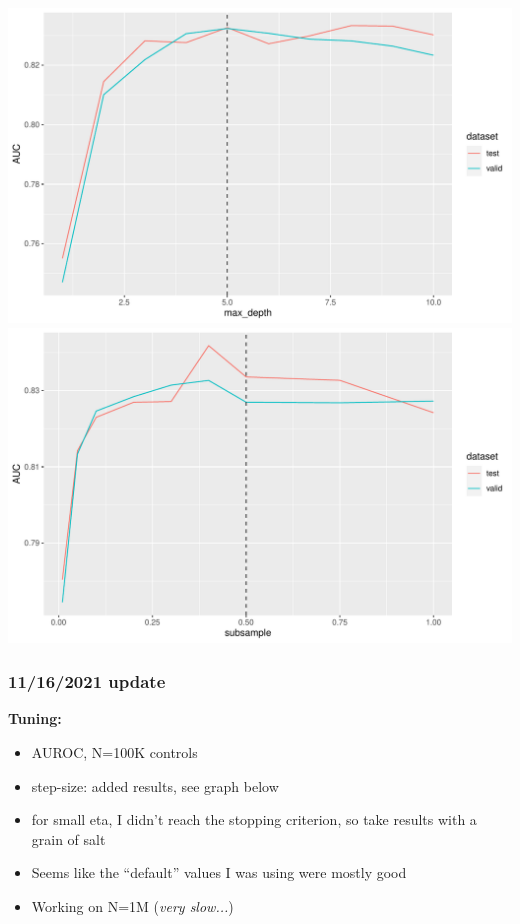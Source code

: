 \documentclass[12pt]{article}
\begin{document}
\begin{center}
\includegraphics[width=.9\textwidth]{best_aucs_tuning_max_depth.pdf}
\includegraphics[width=.9\textwidth]{best_aucs_tuning_subsample.pdf}
\end{center}



\pagebreak
\subsubsection*{11/16/2021 update}

\textbf{Tuning:}
\begin{itemize}
	\item AUROC, N=100K controls
	\item step-size: added results, see graph below
	\item for small eta, I didn't reach the stopping criterion, so take results with a grain of salt
	\item Seems like the ``default'' values I was using were mostly good
	\item Working on N=1M (\textit{very slow...})
\end{itemize}
\end{document}
